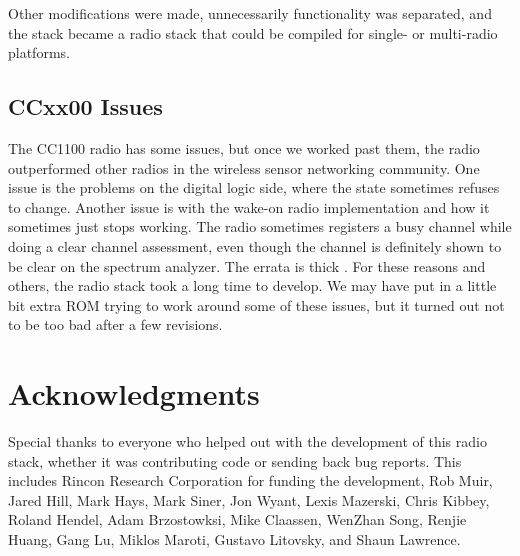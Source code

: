 \documentclass{article}
\begin{document}
Other modifications were made, unnecessarily functionality was separated, and the stack became a radio
stack that could be compiled for single- or multi-radio platforms.

\subsection{CCxx00 Issues}
The CC1100 radio has some issues, but once we worked past them, the radio outperformed other radios 
in the wireless sensor networking community.  One issue is the problems on the digital logic side, where
the state sometimes refuses to change. Another issue is with the wake-on radio implementation and how
it sometimes just stops working.  The radio sometimes registers a busy channel while doing a clear
channel assessment, even though the channel is definitely shown to be clear on the spectrum analyzer.
The errata is thick \cite{cc1101errata}.  For these reasons and others, the radio stack took a long time to develop.  
We may have put in a little bit extra ROM trying to work around some of these issues, but 
it turned out not to be too bad after a few revisions.


\section{Acknowledgments}
Special thanks to everyone who helped out with the development of this radio stack, whether it was 
contributing code or sending back bug reports. This includes Rincon Research Corporation for funding 
the development, Rob Muir, Jared Hill, Mark Hays, Mark Siner, Jon Wyant, Lexis Mazerski, Chris Kibbey, 
Roland Hendel, Adam Brzostowksi, Mike Claassen, WenZhan Song, Renjie Huang, Gang Lu, Miklos Maroti, 
Gustavo Litovsky, and Shaun Lawrence.



		
\end{document}
